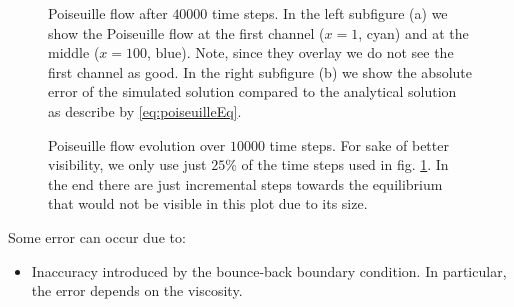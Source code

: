 \documentclass[a4paper,11pt, footsepline]{book}
\begin{document}
\begin{figure}
  \begin{center}
   \caption{Poiseuille flow after $40000$ time steps. In the left subfigure (a) we show the Poiseuille flow at the first channel ($x=1$, cyan) and at the middle ($x=100$, blue). Note, since they overlay we do not see the first channel as good. In the right subfigure (b) we show the absolute error of the simulated solution compared to the analytical solution as describe by \ref{eq:poiseuilleEq}.}
  \label{fig:Poiseuille_vectors}
  \end{center}
\end{figure}
\begin{figure}
  \begin{center}
	\scalebox{0.7}{}
   \caption{Poiseuille flow evolution over $10000$ time steps. For sake of better visibility, we only use just $25\%$ of the time steps used in fig. \ref{fig:Poiseuille_vectors}. In the end there are just incremental steps towards the equilibrium that would not be visible in this plot due to its size.}
  \label{fig:Poiseuille_evolution}
  \end{center}
\end{figure}
Some error can occur due to:
\begin{itemize}
\item Inaccuracy introduced by the bounce-back boundary condition. In particular, the error depends on the viscosity.\cite{Kruger.2016}
\end{itemize}
\end{document}
